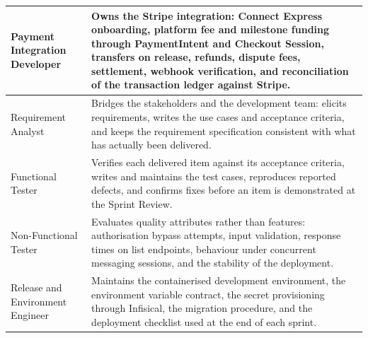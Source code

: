 \begin{longtable}{|L{3.8cm}|L{10.6cm}|}
Payment Integration Developer &
Owns the Stripe integration: Connect Express onboarding, platform fee and milestone funding through PaymentIntent and Checkout Session, transfers on release, refunds, dispute fees, settlement, webhook verification, and reconciliation of the transaction ledger against Stripe.
\\ \hline

Requirement Analyst &
Bridges the stakeholders and the development team: elicits requirements, writes the use cases and acceptance criteria, and keeps the requirement specification consistent with what has actually been delivered.
\\ \hline

Functional Tester &
Verifies each delivered item against its acceptance criteria, writes and maintains the test cases, reproduces reported defects, and confirms fixes before an item is demonstrated at the Sprint Review.
\\ \hline

Non-Functional Tester &
Evaluates quality attributes rather than features: authorisation bypass attempts, input validation, response times on list endpoints, behaviour under concurrent messaging sessions, and the stability of the deployment.
\\ \hline

Release and Environment Engineer &
Maintains the containerised development environment, the environment variable contract, the secret provisioning through Infisical, the migration procedure, and the deployment checklist used at the end of each sprint.
\\ \hline

\end{longtable}

\endgroup
